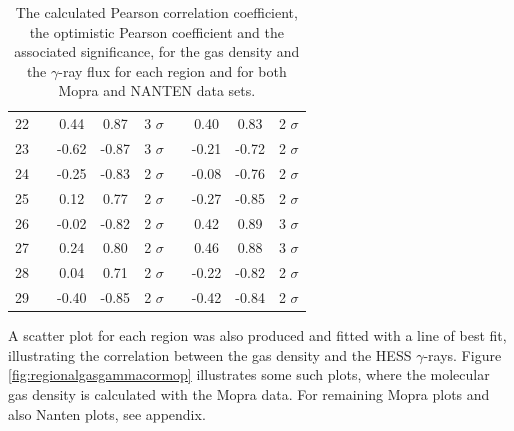 \documentclass[12pt,a4paper]{article}
\begin{document}
\begin{table}[H]
\begin{tabular}{ccccccccc}
		22 && 0.44 & 0.87 & 3 $\sigma$ && 0.40 & 0.83 & 2 $\sigma$ \\
		23 && -0.62 & -0.87 & 3 $\sigma$ && -0.21 & -0.72 & 2 $\sigma$ \\
		24 && -0.25 & -0.83 & 2 $\sigma$ && -0.08 & -0.76 & 2 $\sigma$ \\
		25 && 0.12 & 0.77 & 2 $\sigma$ && -0.27 & -0.85 & 2 $\sigma$ \\
		26 && -0.02 & -0.82 & 2 $\sigma$ && 0.42 & 0.89 & 3 $\sigma$ \\ 
		27 && 0.24 & 0.80 & 2 $\sigma$ && 0.46 & 0.88 & 3 $\sigma$ \\
		28 && 0.04 & 0.71 & 2 $\sigma$ && -0.22 & -0.82 & 2 $\sigma$ \\
		29 && -0.40 & -0.85 & 2 $\sigma$ && -0.42 & -0.84 & 2 $\sigma$ \\
		\hline 
	\end{tabular} 
	\caption{The calculated Pearson correlation coefficient, the optimistic Pearson coefficient and the associated significance, for the gas density and the $\gamma$-ray flux for each region and for both Mopra and NANTEN data sets.}
	\label{tab:gasgammacor}
\end{table}

A scatter plot for each region was also produced and fitted with a line of best fit, illustrating the correlation between the gas density and the HESS $\gamma$-rays. 
Figure \ref{fig:regionalgasgammacormop} illustrates some such plots, where the molecular gas density is calculated with the Mopra data. For remaining Mopra plots and also Nanten plots, see appendix.
\end{document}

